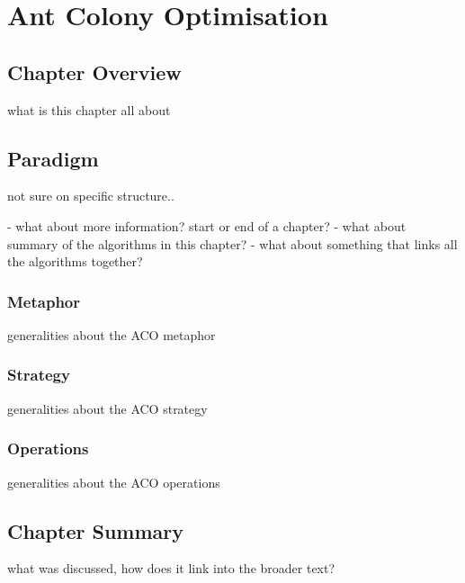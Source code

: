 %
%


%
%
\chapter{Ant Colony Optimisation}
\label{ch:aco}


%
%
\section{Chapter Overview}
\label{sec:aco:overview}
what is this chapter all about


%
%
\section{Paradigm}
\label{sec:aco:paradigm}
not sure on specific structure..

- what about more information? start or end of a chapter?
- what about summary of the algorithms in this chapter?
- what about something that links all the algorithms together?

%
%
\subsection{Metaphor}
generalities about the ACO metaphor

%
%
\subsection{Strategy}
generalities about the ACO strategy


%
%
\subsection{Operations}
generalities about the ACO operations





%
%

\newpage
\newpage

\newpage


%
%
\section{Chapter Summary}
\label{sec:aco:summary}
what was discussed, how does it link into the broader text?



